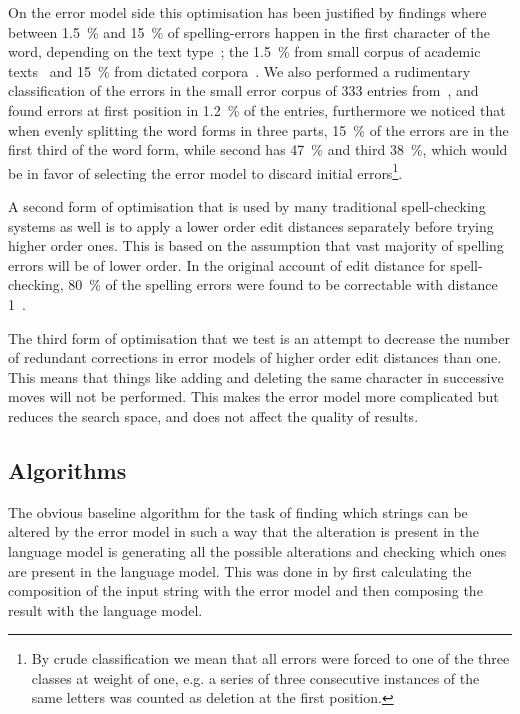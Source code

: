 \documentclass[11pt]{article}
\begin{document}
On the error model side this optimisation has been justified by findings where
between 1.5~\% and 15~\% of spelling-errors happen in the first character of
the word, depending on the text type~\cite{Bhagat/2007};
the 1.5~\% from small corpus of academic texts~\cite{Yannakoudakis/1983}
and 15~\% from dictated corpora~\cite{Kukich/1992}. We also performed a
rudimentary classification of the errors in the small error corpus of
333 entries from~, and found errors at
first position in 1.2~\% of the entries, furthermore we noticed that
when evenly splitting the word forms in three parts, 15~\% of the errors are
in the first third of the word form, while second has 47~\% and third 38~\%,
which would be in favor of selecting the error model to discard initial
errors\footnote{By crude classification we mean that all errors were
forced to one of the three classes at weight of one, e.g. a series of
three consecutive instances of the same letters was counted as deletion at
the first position.}.

A second form of optimisation that is used by many traditional spell-checking
systems as well is to apply a lower order edit distances separately before
trying higher order ones. This is based on the assumption that vast majority
of spelling errors will be of lower order. In the original
account of edit distance for spell-checking, 80~\% of the spelling
errors were found to be correctable with distance 1~\cite{Pollock/1984}.

The third form of optimisation that we test is an attempt to decrease the
number of redundant corrections in error models of higher order edit distances
than one. This means that things like  adding and deleting the
same character in successive moves will not be performed. This makes the error
model more complicated but reduces the search space, and does not affect the
quality of results.

\subsection{Algorithms}
\label{sec:algorithms}
The obvious baseline algorithm for the task of finding which strings can be
altered by the error model in such a way that the alteration is present in the
language model is generating all the possible alterations and checking which
ones are present in the language model. This was done in 
by first calculating the composition of the input string with the error
model and then composing the result with the language model.
\end{document}
